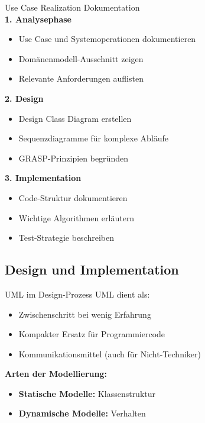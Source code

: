 \begin{corollary}{Use Case Realization Dokumentation}\\
\textbf{1. Analysephase}
\begin{itemize}
    \item Use Case und Systemoperationen dokumentieren
    \item Domänenmodell-Ausschnitt zeigen
    \item Relevante Anforderungen auflisten
\end{itemize}

\textbf{2. Design}
\begin{itemize}
    \item Design Class Diagram erstellen
    \item Sequenzdiagramme für komplexe Abläufe
    \item GRASP-Prinzipien begründen
\end{itemize}

\textbf{3. Implementation}
\begin{itemize}
    \item Code-Struktur dokumentieren
    \item Wichtige Algorithmen erläutern
    \item Test-Strategie beschreiben
\end{itemize}
\end{corollary}

\subsection{Design und Implementation}

\begin{concept}{UML im Design-Prozess}
UML dient als:
\begin{itemize}
    \item Zwischenschritt bei wenig Erfahrung
    \item Kompakter Ersatz für Programmiercode
    \item Kommunikationsmittel (auch für Nicht-Techniker)
\end{itemize}

\textbf{Arten der Modellierung:}
\begin{itemize}
    \item \textbf{Statische Modelle:} Klassenstruktur
    \item \textbf{Dynamische Modelle:} Verhalten
\end{itemize}
\end{concept}

